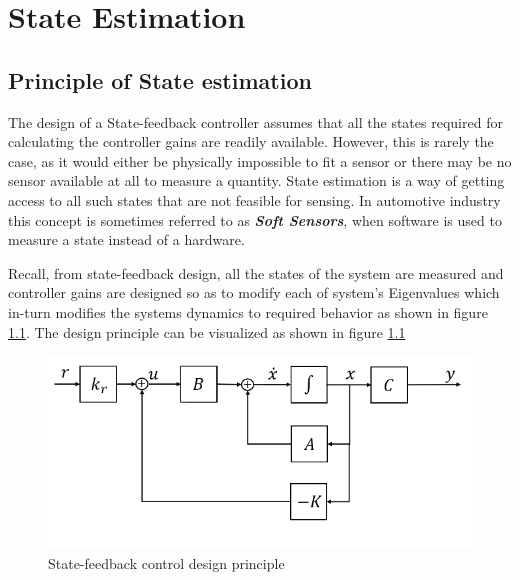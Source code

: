 \chapter{State Estimation}

\section{Principle of State estimation}

The design of a State-feedback controller assumes that all the states required for calculating the controller gains are readily available. However, this is rarely the case, as it would either be physically impossible to fit a sensor or there may be no sensor available at all to measure a quantity. State estimation is a way of getting access to all such states that are not feasible for sensing. In automotive industry this concept is sometimes referred to as \textbf{\textit{Soft Sensors}}, when software is used to measure a state instead of a hardware. 

Recall, from state-feedback design, all the states of the system are measured and controller gains are designed so as to modify each of system's Eigenvalues which in-turn modifies the systems dynamics to required behavior as shown in figure \ref{Fig_SE_SFB_Principle}. The design principle can be visualized as shown in figure \ref{Fig_SE_SFB_Principle}
\begin{figure}[h!]
	\centering
	\includegraphics[width=0.6\linewidth]{Bilder/SE_FB_Principle}
	\caption{State-feedback control design principle}
	\label{Fig_SE_SFB_Principle}
\end{figure}

